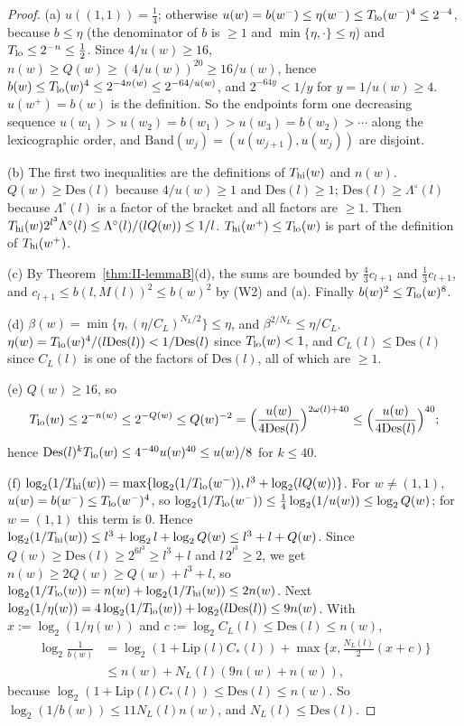 \documentclass[10pt]{amsart}
\theoremstyle{definition}
\theoremstyle{remark}
\begin{document}
\begin{proof}
(a) $u((1,1))=\frac14$; otherwise $u(w)=b(w^-)\le\eta(w^-)\le
T_{\rm lo}(w^-)^4\le2^{-4}$, because $b\le\eta$ (the denominator of $b$
is $\ge1$ and $\min\{\eta,\cdot\}\le\eta$) and $T_{\rm lo}\le2^{-n}\le\frac12$.
Since $4/u(w)\ge16$, $n(w)\ge Q(w)\ge(4/u(w))^{20}\ge16/u(w)$, hence
$b(w)\le T_{\rm lo}(w)^4\le2^{-4n(w)}\le2^{-64/u(w)}$, and $2^{-64y}<1/y$
for $y=1/u(w)\ge4$.  $u(w^+)=b(w)$ is the definition.  So the endpoints
form one decreasing sequence $u(w_1)>u(w_2)=b(w_1)>u(w_3)=b(w_2)>\cdots$
along the lexicographic order, and $\mathrm{Band}(w_j)=(u(w_{j+1}),
u(w_j))$ are disjoint.

(b) The first two inequalities are the definitions of $T_{\rm hi}(w)$ and
$n(w)$.  $Q(w)\ge\mathrm{Des}(l)$ because $4/u(w)\ge1$ and
$\mathrm{Des}(l)\ge1$; $\mathrm{Des}(l)\ge\Lambda^\circ(l)$ because
$\Lambda^\circ(l)$ is a factor of the bracket and all factors are $\ge1$.
Then $T_{\rm hi}(w)2^{l^3}\Lambda^\circ(l)\le\Lambda^\circ(l)/(lQ(w))\le
1/l$.  $T_{\rm hi}(w^+)\le T_{\rm lo}(w)$ is part of the definition of
$T_{\rm hi}(w^+)$.

(c) By Theorem~\ref{thm:II-lemmaB}(d), the sums are bounded by
$\frac43c_{l+1}$ and $\frac13c_{l+1}$, and $c_{l+1}\le b(l,M(l))^2\le
b(w)^2$ by (W2) and (a).  Finally $b(w)^2\le T_{\rm lo}(w)^8$.

(d) $\beta(w)=\min\{\eta,(\eta/C_L)^{N_L/2}\}\le\eta$, and
$\beta^{2/N_L}\le\eta/C_L$.  $\eta(w)=T_{\rm lo}(w)^4/(l\mathrm{Des}(l))<
1/\mathrm{Des}(l)$ since $T_{\rm lo}(w)<1$, and $C_L(l)\le\mathrm{Des}(l)$
since $C_L(l)$ is one of the factors of $\mathrm{Des}(l)$, all of which are
$\ge1$.

(e) $Q(w)\ge16$, so
\[
 T_{\rm lo}(w)\le2^{-n(w)}\le2^{-Q(w)}\le Q(w)^{-2}=
 \Big(\frac{u(w)}{4\mathrm{Des}(l)}\Big)^{2\omega(l)+40}\le
 \Big(\frac{u(w)}{4\mathrm{Des}(l)}\Big)^{40};
\]
hence $\mathrm{Des}(l)^kT_{\rm lo}(w)\le4^{-40}u(w)^{40}\le u(w)/8$ for
$k\le40$.

(f) $\log_2(1/T_{\rm hi}(w))=\max\{\log_2(1/T_{\rm lo}(w^-)),l^3+\log_2
(lQ(w))\}$.  For $w\ne(1,1)$, $u(w)=b(w^-)\le T_{\rm lo}(w^-)^4$, so
$\log_2(1/T_{\rm lo}(w^-))\le\frac14\log_2(1/u(w))\le\log_2Q(w)$; for
$w=(1,1)$ this term is $0$.  Hence $\log_2(1/T_{\rm hi}(w))\le
l^3+\log_2l+\log_2Q(w)\le l^3+l+Q(w)$.  Since $Q(w)\ge\mathrm{Des}(l)\ge
2^{6l^3}\ge l^3+l$ and $l\,2^{l^3}\ge2$, we get $n(w)\ge2Q(w)\ge Q(w)+l^3+l$,
so $\log_2(1/T_{\rm lo}(w))=n(w)+\log_2(1/T_{\rm hi}(w))\le2n(w)$.  Next
$\log_2(1/\eta(w))=4\log_2(1/T_{\rm lo}(w))+\log_2(l\mathrm{Des}(l))\le
9n(w)$.  With $x:=\log_2(1/\eta(w))$ and $c:=\log_2C_L(l)\le\mathrm{Des}(l)
\le n(w)$,
\begin{align*}
 \log_2\frac1{b(w)}&=\log_2(1+\mathrm{Lip}(l)C_*(l))+\max\Big\{x,
 \frac{N_L(l)}2(x+c)\Big\}\\
 &\le n(w)+N_L(l)(9n(w)+n(w)),
\end{align*}
because $\log_2(1+\mathrm{Lip}(l)C_*(l))\le\mathrm{Des}(l)\le n(w)$.  So
$\log_2(1/b(w))\le11N_L(l)n(w)$, and $N_L(l)\le\mathrm{Des}(l)$.
\end{proof}
\end{document}
